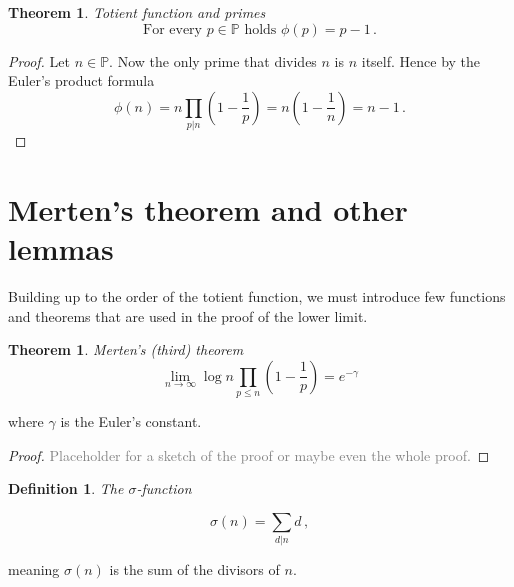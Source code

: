 \documentclass{article}
\theoremstyle{definition}
\newtheorem{definition}[subsubsection]{Definition}
\newtheorem{theorem}[subsubsection]{Theorem}
\begin{document}
\begin{theorem}{\emph{Totient function and primes}}
\label{thm:phiprime}
\begin{equation*}
    \text{For every } p \in \mathbb{P} \text{ holds } \phi(p) = p-1\,.
\end{equation*}

\begin{proof}

Let $n\in\mathbb{P}$. Now the only prime that divides $n$ is $n$ itself. Hence by the Euler's product formula
\begin{equation*}
    \phi(n) = n \prod_{p \vert n} \left(1 - \frac{1}{p}\right) = n\left(1-\frac{1}{n}\right) = n-1\,.
\end{equation*}

\end{proof}

\end{theorem}

\section{Merten's theorem and other lemmas}

Building up to the order of the totient function, we must introduce few functions and theorems that are used in the proof of the lower limit.

\begin{theorem}{\emph{Merten's (third) theorem}}
\label{thm:mertens}
\begin{equation*}
    \lim_{n \rightarrow \infty} \log n \prod_{p\leq n} \left(1-\frac{1}{p}\right) = e^{-\gamma}
\end{equation*}

where $\gamma$ is the Euler's constant.

\begin{proof}

\textcolor{gray}{Placeholder for a sketch of the proof or maybe even the whole proof.}

\end{proof}

\end{theorem}

\begin{definition}{\emph{The $\sigma$-function}}

\begin{equation*}
    \sigma(n)=\sum_{d\vert n} d\,,
\end{equation*}

meaning $\sigma(n)$ is the sum of the divisors of $n$.
\end{definition}
\end{document}
